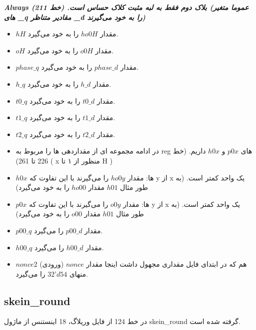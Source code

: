 \textit{\textbf{Always بلاک دوم فقط به لبه مثبت کلاک حساس است. (خط 211)
	(عموما متغیر های \_q مقادیر متناظر \_d را به خود می‌گیرند) }}
\begin{itemize}
	\item
	      $hH$ مقدار $ho0H$ را به خود می‌گیرد.
	\item
	      $oH$ مقدار $o0H$ را به خود می‌گیرد.
	\item
	      $phase\_q$ مقدار $phase\_d$ را به خود می‌گیرد.
	\item
	      $h\_q$ مقدار $h\_d$ را به خود می‌گیرد.
	\item
	      $t0\_q$ مقدار $t0\_d$ را به خود می‌گیرد.
	\item
	      $t1\_q$ مقدار $t1\_d$ را به خود می‌گیرد.
	\item
	      $t2\_q$ مقدار $t2\_d$ را به خود می‌گیرد.
	\item
	      در ادامه مجموعه ای از مقداردهی ها را مربوط به reg های
	       $p0x$
	      و 
	      $h0x$ 
	داریم. (خط 226 تا 261)
	( x منظور از ۱ تا H )
	\item
	      $h0x$ ها: مقدار $ho0y$ را می‌گیرند با این تفاوت که y از x یک واحد کمتر است. (به طور مثال $h01$ مقدار $ho00$ را به خود می‌گیرد)
	\item
	      $p0x$  ها: مقدار $o0y$ را می‌گیرند با این تفاوت که y از x یک واحد کمتر است. (به طور مثال $h01$ مقدار $o00$ را به خود می‌گیرد)
	\item
	      $p00\_q$ مقدار $p00\_d$ را می‌گیرد.
	\item
	      $h00\_q$ مقدار $h00\_d$ را می‌گیرد.
	\item
	      $nonce2$ هم که در ابتدای فایل مقداری مجهول داشت اینجا مقدار $nonce$ (ورودی)  منهای 
	      $32’d54$
	       را می‌گیرد.
\end{itemize}


\subsection{skein\_round}
در خط 124 از فایل وریلاگ، 18 اینستنس از ماژول skein\_round گرفته شده است.
